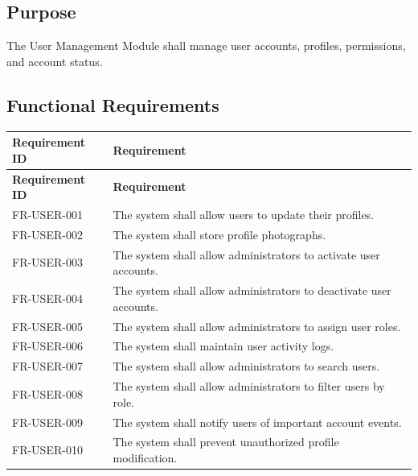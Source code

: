\subsection{Purpose}

The User Management Module shall manage user accounts, profiles,
permissions, and account status.

\subsection{Functional Requirements}

\begin{longtable}{|p{2.8cm}|p{10.5cm}|}

\hline
\textbf{Requirement ID} &
\textbf{Requirement} \\
\hline
\endfirsthead

\hline
\textbf{Requirement ID} &
\textbf{Requirement} \\
\hline
\endhead

FR-USER-001 &
The system shall allow users to update their profiles. \\
\hline

FR-USER-002 &
The system shall store profile photographs. \\
\hline

FR-USER-003 &
The system shall allow administrators to activate user accounts. \\
\hline

FR-USER-004 &
The system shall allow administrators to deactivate user accounts. \\
\hline

FR-USER-005 &
The system shall allow administrators to assign user roles. \\
\hline

FR-USER-006 &
The system shall maintain user activity logs. \\
\hline

FR-USER-007 &
The system shall allow administrators to search users. \\
\hline

FR-USER-008 &
The system shall allow administrators to filter users by role. \\
\hline

FR-USER-009 &
The system shall notify users of important account events. \\
\hline

FR-USER-010 &
The system shall prevent unauthorized profile modification. \\
\hline

\end{longtable}

